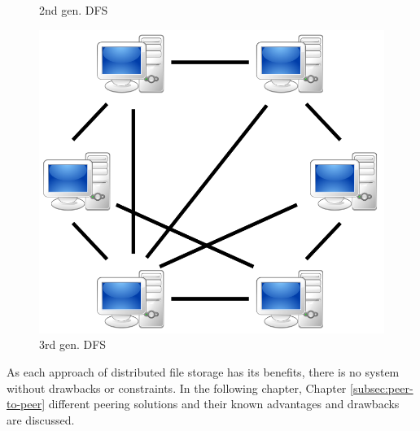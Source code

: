 \begin{figure}
\begin{minipage}{.33\textwidth}
		\caption[myfakelabel]{2nd gen. DFS}
		\label{2nd_gen_dfs}
	\end{minipage}
	\begin{minipage}{.33\textwidth}
		\centering
		\includegraphics[scale=0.175]{Talk5/3rd_gen_dfs.PNG}
		\caption[myfakelabel]{3rd gen. DFS\footnotemark[1]{}}
		\label{3rd_gen_dfs}
	\end{minipage}
\end{figure}

As each approach of distributed file storage has its benefits, there is no system without drawbacks or constraints. In the following chapter, Chapter \ref{subsec:peer-to-peer} different peering solutions and their known advantages and drawbacks are discussed.

